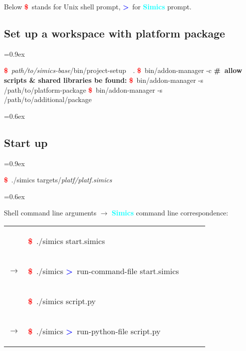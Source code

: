 \documentclass[8pt]{extarticle}
\newenvironment{code}[1][]{%
\begin{prebox}[#1]\obeylines%
\fontdimen2\font=0.9ex%
}{%
\end{prebox}%
\fontdimen2\font=0.6ex%
}
\newenvironment{codem}[1][\linewidth]{%
\begin{minipage}{#1}%
\begin{prebox}\obeylines}{%
\end{prebox}%
\end{minipage}}
\newenvironment{code9}{\begin{codem}[0.9\linewidth]}{\end{codem}}
\newcommand{\prompt}{\textcolor{red}{\textbf{\$}\ }}
\newcommand{\sprompt}{\textcolor{blue}{\textbf{>}\ }}
\newcommand{\cmtcommon}[1]{\textcolor{Sepia}{\textbf{#1}}}
\newcommand{\cmt}[1]{\cmtcommon{\#\ #1}}
\newcommand{\p}[1]{\textit{\large#1}}
\newcommand{\Simics}{\textcolor{cyan}{\textbf{Simics}}}
\begin{document}
\begin{multicols*}{3}
    Below \prompt stands for Unix shell prompt, \sprompt for \Simics{} prompt.

\subsection{Set up a workspace with platform package}
    \begin{code}
        \prompt \p{path/to/simics-base}/bin/project-setup\ \ .
        \prompt bin/addon-manager -c
        \cmt{allow scripts \& shared libraries be found:}
        \prompt bin/addon-manager -s /path/to/platform-package
        \prompt bin/addon-manager -s /path/to/additional/package
    \end{code}

\subsection{Start up}
    \begin{code}
        \prompt ./simics targets/\p{platf/platf.simics}
    \end{code}

    
    Shell command line arguments $\longrightarrow$ \Simics{} command line 
        correspondence:

    \begin{tabular}{lp{0.9\linewidth}}
        &
        \begin{code9}
            \prompt ./simics start.simics
        \end{code9}
        \vspace{0.05cm}
        \\
        $\longrightarrow$ &
        \begin{code9}
            \prompt ./simics
            \sprompt run-command-file start.simics
        \end{code9}
        \vspace{0.2cm}
        \\

        & \begin{code9}
            \prompt ./simics script.py
        \end{code9}
        \vspace{0.05cm}
        \\
        $\longrightarrow$ &
        \begin{code9}
            \prompt ./simics
            \sprompt run-python-file script.py
        \end{code9}
        \vspace{0.2cm}
        \\


\end{tabular}
\end{multicols*}
\end{document}
